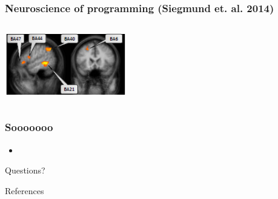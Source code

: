 \documentclass[10pt]{beamer}
\begin{document}
\begin{frame}
  \frametitle{Neuroscience of programming (Siegmund et. al. 2014)}
  \begin{columns}[c]
      \includegraphics[width=0.9\textwidth]{./media/92170_Figure1-cropped.png}
  \end{columns}

\end{frame}

\begin{frame}
  \frametitle{Sooooooo}
  \begin{itemize}
    \item
  \end{itemize}
\end{frame}

\begin{frame}[standout]
  Questions?
\end{frame}

\appendix

\begin{frame}[allowframebreaks]{References}
  \printbibliography

\end{frame}
\end{document}
